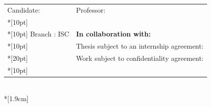 \begin{spacing}{0.956}
\begin{center}
		{
			\begin{tabular*}{16cm}{p{7.59cm} p{7.58cm}}
				\small Candidate:					&	\small Professor:\\*[10pt]
				\small\textbf{\textsc{\Author}}		&	\small\textbf{\textsc{\Professor}}\\*[10pt]
				\footnotesize  Branch : ISC	&	\footnotesize  \textbf{In collaboration with:}  \\*[10pt]
				\footnotesize  {} & \footnotesize  Thesis subject to an internship agreement: \Convention\\*[20pt]
				\footnotesize  {} & \footnotesize  Work subject to confidentiality agreement: \Confidentiel\\*[10pt]
			\end{tabular*}\\*[1.9cm]
		}

	\end{center}
\end{spacing}
